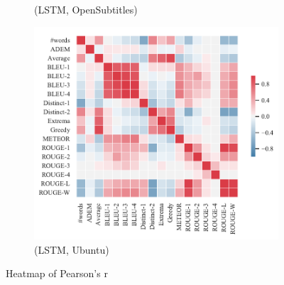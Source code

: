 \begin{figure}[htbp]
\begin{subfigure}{0.35\linewidth}
        \caption{(LSTM, OpenSubtitles)}
    \end{subfigure}%
    \begin{subfigure}{0.35\linewidth}
        \centering
        \includegraphics[width=\linewidth]{figure/plot/heatmap/v4/pearson/lstm/ubuntu/plot.pdf}
        \caption{(LSTM, Ubuntu)}
    \end{subfigure}
    \caption{Heatmap of Pearson's r}
    \label{fig:corr_heatmap}
\end{figure}
